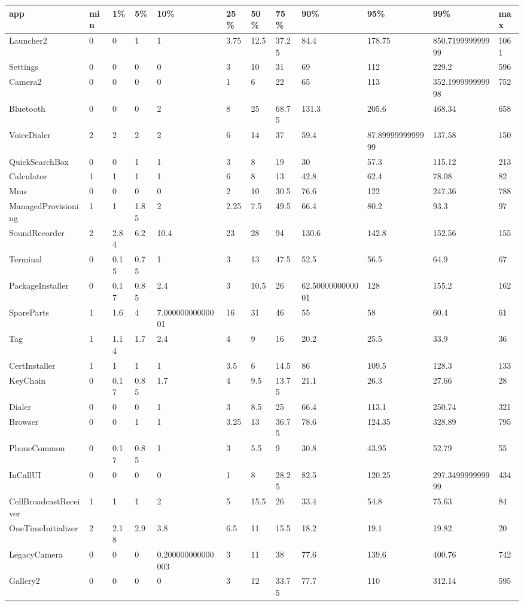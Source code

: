 \begin{tabular}{|l|l|l|l|l|l|l|l|l|l|l|l|}
\hline
app&min&1\%&5\%&10\%&25\%&50\%&75\%&90\%&95\%&99\%&max\\
\hline
Launcher2&0&0&1&1&3.75&12.5&37.25&84.4&178.75&850.719999999999&1061\\
\hline
Settings&0&0&0&0&3&10&31&69&112&229.2&596\\
\hline
Camera2&0&0&0&0&1&6&22&65&113&352.199999999998&752\\
\hline
Bluetooth&0&0&0&2&8&25&68.75&131.3&205.6&468.34&658\\
\hline
VoiceDialer&2&2&2&2&6&14&37&59.4&87.8999999999999&137.58&150\\
\hline
QuickSearchBox&0&0&1&1&3&8&19&30&57.3&115.12&213\\
\hline
Calculator&1&1&1&1&6&8&13&42.8&62.4&78.08&82\\
\hline
Mms&0&0&0&0&2&10&30.5&76.6&122&247.36&788\\
\hline
ManagedProvisioning&1&1&1.85&2&2.25&7.5&49.5&66.4&80.2&93.3&97\\
\hline
SoundRecorder&2&2.84&6.2&10.4&23&28&94&130.6&142.8&152.56&155\\
\hline
Terminal&0&0.15&0.75&1&3&13&47.5&52.5&56.5&64.9&67\\
\hline
PackageInstaller&0&0.17&0.85&2.4&3&10.5&26&62.5000000000001&128&155.2&162\\
\hline
SpareParts&1&1.6&4&7.00000000000001&16&31&46&55&58&60.4&61\\
\hline
Tag&1&1.14&1.7&2.4&4&9&16&20.2&25.5&33.9&36\\
\hline
CertInstaller&1&1&1&1&3.5&6&14.5&86&109.5&128.3&133\\
\hline
KeyChain&0&0.17&0.85&1.7&4&9.5&13.75&21.1&26.3&27.66&28\\
\hline
Dialer&0&0&0&1&3&8.5&25&66.4&113.1&250.74&321\\
\hline
Browser&0&0&1&1&3.25&13&36.75&78.6&124.35&328.89&795\\
\hline
PhoneCommon&0&0.17&0.85&1&3&5.5&9&30.8&43.95&52.79&55\\
\hline
InCallUI&0&0&0&0&1&8&28.25&82.5&120.25&297.349999999999&434\\
\hline
CellBroadcastReceiver&1&1&1&2&5&15.5&26&33.4&54.8&75.63&84\\
\hline
OneTimeInitializer&2&2.18&2.9&3.8&6.5&11&15.5&18.2&19.1&19.82&20\\
\hline
LegacyCamera&0&0&0&0.200000000000003&3&11&38&77.6&139.6&400.76&742\\
\hline
Gallery2&0&0&0&0&3&12&33.75&77.7&110&312.14&595\\

\end{tabular}
